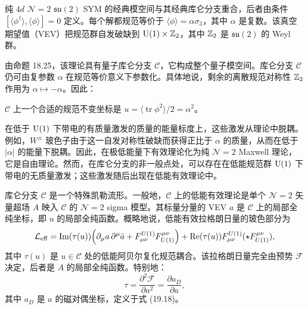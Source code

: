 
\begin{proposition}[20.1]
纯 $4d$ $\mathcal{N}=2$ $\mathfrak{su}(2)$ SYM 的经典模空间与其经典库仑分支重合，后者由条件 $[\langle\phi^\dagger\rangle,\langle\phi\rangle]=0$ 定义。每个解都规范等价于 $\langle\phi\rangle=\alpha\sigma_3$，其中 $\alpha$ 是复数。该真空期望值（VEV）把规范群自发破缺到 $\operatorname{U}(1)\times\mathbb{Z}_2$，其中 $\mathbb{Z}_2$ 是 $\mathfrak{su}(2)$ 的 Weyl 群。
\end{proposition}

由命题 18.25，该理论具有量子库仑分支 $\mathcal{C}$，它构成整个量子模空间。库仑分支 $\mathcal{C}$ 仍可由复参数 $\alpha$ 在规范等价意义下参数化。具体地说，剩余的离散规范对称性 $\mathbb{Z}_2$ 作用为 $\alpha\mapsto-\alpha$。因此：

\begin{proposition}[20.2]
$\mathcal{C}$ 上一个合适的规范不变坐标是 $u=\langle\operatorname{tr}\phi^2\rangle/2=\alpha^2$。
\end{proposition}

在低于 $\operatorname{U}(1)$ 下带电的有质量激发的质量的能量标度上，这些激发从理论中脱耦。例如，$W^\pm$ 玻色子由于这一自发对称性破缺而获得正比于 $\alpha$ 的质量，从而在低于 $|\alpha|$ 的能量下脱耦。因此，在极低能量下有效理论化为纯 $\mathcal{N}=2$ Maxwell 理论，它是自由理论。然而，在库仑分支的非一般点处，可以存在在低能规范群 $\operatorname{U}(1)$ 下带电的无质量激发；这些激发随后出现在低能有效理论中。

库仑分支 $\mathcal{C}$ 是一个特殊凯勒流形。一般地，$\mathcal{C}$ 上的低能有效理论是单个 $\mathcal{N}=2$ 矢量超场 $A$ 映入 $\mathcal{C}$ 的 $\mathcal{N}=2$ sigma 模型。其标量分量的 VEV $a$ 是 $\mathcal{C}$ 上的局部全纯坐标，即 $u$ 的局部全纯函数。概略地说，低能有效拉格朗日量的玻色部分为
\[
\mathcal{L}_{\mathrm{eff}}=\operatorname{Im}(\tau(u))\Bigl(\partial_\mu a\,\partial^\mu\bar a+F^{U(1)}_{\mu\nu}F^{\mu\nu}_{U(1)}\Bigr)+\operatorname{Re}(\tau(u))F^{U(1)}_{\mu\nu}(\star F^{\mu\nu}_{U(1)}),
\]
其中 $\tau(u)$ 是 $u\in\mathcal{C}$ 处的低能阿贝尔复化规范耦合。该拉格朗日量完全由预势 $\mathcal{F}$ 决定，后者是 $A$ 的局部全纯函数。特别地：
\[
\tau=\frac{\partial^2\mathcal{F}}{\partial a^2}=\frac{\partial a_D}{\partial a},
\]
其中 $a_D$ 是 $a$ 的磁对偶坐标，定义于式 (19.18)。

